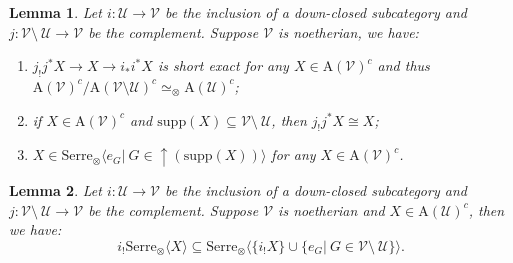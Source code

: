 \documentclass[10pt,a4paper]{amsart}
\newtheorem{lem}{Lemma}
\begin{document}
\begin{lem}\label{lem4.12} Let $i:\mathcal{U}\rightarrow \mathcal{V}$ be the inclusion of a down-closed subcategory  and $j:\mathcal{V}\setminus~\mathcal{U}\rightarrow \mathcal{V}$ be the complement. Suppose $\mathcal{V}$ is noetherian, we have:
\begin{enumerate}
\item $j_{!}j^{*}X\rightarrow X\rightarrow i_{*}i^{*}X$ is short exact for any $X\in \mathrm{A}(\mathcal{V})^{c}$ and thus $\mathrm{A}(\mathcal{V})^{c}/\mathrm{A}(\mathcal{V}\setminus \mathcal{U})^{c}\simeq_{\otimes} \mathrm{A}(\mathcal{U})^{c} $;

\item if $X\in \mathrm{A}(\mathcal{V})^{c}$ and $ \mathrm{supp}(X)\subseteq \mathcal{V}\setminus~\mathcal{U}$, then $j_{!}j^{*}X\cong X$;

\item $X\in \mathrm{Serre}_{\otimes}\langle e_{G}|~G\in \uparrow(\mathrm{supp}(X))\rangle$ for any $X\in \mathrm{A}(\mathcal{V})^{c}$.

\end{enumerate}
\end{lem}

\begin{lem}\label{lem4.13} Let $i:\mathcal{U}\rightarrow \mathcal{V}$ be the inclusion of a down-closed subcategory  and $j:\mathcal{V}\setminus~\mathcal{U}\rightarrow \mathcal{V}$ be the complement. Suppose $\mathcal{V}$ is noetherian and $X\in \mathrm{A}(\mathcal{U})^{c}$, then we have: $$i_{!}\mathrm{Serre}_{\otimes}\langle X\rangle\subseteq \mathrm{Serre}_{\otimes}\langle \{i_{!}X\}\cup \{e_{G}|~G\in \mathcal{V}\setminus~\mathcal{U}\}\rangle.$$
\end{lem}
\end{document}
